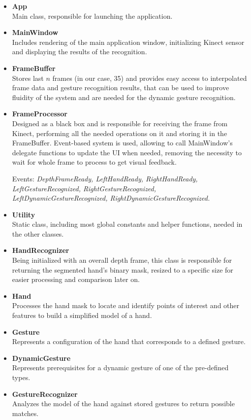 \documentclass[a4paper,11pt,oneside]{article}
\begin{document}
\begin{itemize}

\item \textbf{App}\\
Main class, responsible for launching the application.

\item \textbf{MainWindow}\\
Includes rendering of the main application window, initializing Kinect sensor and displaying the results of the recognition.

\item \textbf{FrameBuffer}\\
Stores last $n$ frames (in our case, 35) and provides easy access to interpolated frame data and gesture recognition results, that can be used to improve fluidity of the system and are needed for the dynamic gesture recognition.

\item \textbf{FrameProcessor}\\
Designed as a black box and is responsible for receiving the frame from Kinect, performing all the needed operations on it and storing it in the FrameBuffer. Event-based system is used, allowing to call MainWindow's delegate functions to update the UI when needed, removing the necessity to wait for whole frame to process to get visual feedback.

Events: \textit{DepthFrameReady, LeftHandReady, RightHandReady, LeftGestureRecognized, RightGestureRecognized, LeftDynamicGestureRecognized, RightDynamicGestureRecognized.}

\item \textbf{Utility}\\
Static class, including most global constants and helper functions, needed in the other classes.

\item \textbf{HandRecognizer}\\
Being initialized with an overall depth frame, this class is responsible for returning the segmented hand's binary mask, resized to a specific size for easier processing and comparison later on.

\item \textbf{Hand}\\
Processes the hand mask to locate and identify points of interest and other features to build a simplified model of a hand.

\item \textbf{Gesture}\\
Represents a configuration of the hand that corresponds to a defined gesture.

\item \textbf{DynamicGesture}\\
Represents prerequisites for a dynamic gesture of one of the pre-defined types.

\item \textbf{GestureRecognizer}\\
Analyzes the model of the hand against stored gestures to return possible matches.

\end{itemize}
\end{document}
